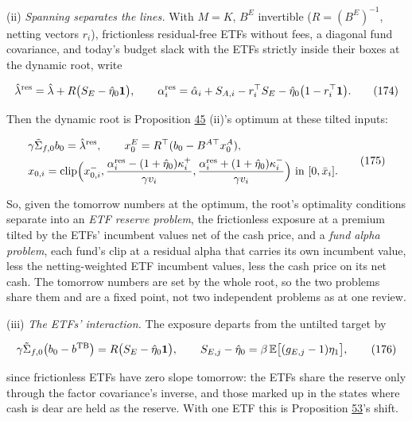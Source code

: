 \documentclass[11pt]{article}
\begin{document}
(ii) \emph{Spanning separates the lines.} With \(M=K\), \(B^E\) invertible
(\(R=(B^E)^{-1}\), netting vectors \(r_i\)), frictionless residual-free ETFs without
fees, a diagonal fund covariance, and today's budget slack with the
ETFs strictly inside their boxes at the dynamic root, write

\begin{equation*}
\hat\lambda^{\rm res}=\hat\lambda+R\bigl(S_E-\hat\eta_0\mathbf 1\bigr),\qquad
\alpha^{\rm res}_i=\hat\alpha_i+S_{A,i}-r_i^\top S_E-\hat\eta_0\bigl(1-r_i^\top\mathbf 1\bigr).\tag{174}\label{eq:174}
\end{equation*}

Then the dynamic root is Proposition \hyperref[res:Proposition-45]{45} (ii)'s optimum at these tilted
inputs:

\begin{equation*}
\begin{aligned}
&\gamma\tilde\Sigma_{f,0}b_0=\hat\lambda^{\rm res},\qquad x^E_0=R^\top(b_0-B^{A\top}x^A_0),\\
&x_{0,i}=\mathrm{clip}\Bigl(x^-_{0,i},\frac{\alpha^{\rm res}_i-(1+\hat\eta_0)\kappa^+_i}{\gamma v_i},\frac{\alpha^{\rm res}_i+(1+\hat\eta_0)\kappa^-_i}{\gamma v_i}\Bigr)\text{ in }[0,\bar x_i].
\end{aligned}\tag{175}\label{eq:175}
\end{equation*}

So, given the tomorrow numbers at the optimum, the root's optimality
conditions separate into an \emph{ETF reserve problem}, the frictionless
exposure at a premium tilted by the ETFs' incumbent values net of the
cash price, and a \emph{fund alpha problem}, each fund's clip at a residual
alpha that carries its own incumbent value, less the netting-weighted
ETF incumbent values, less the cash price on its net cash. The tomorrow
numbers are set by the whole root, so the two problems share them and
are a fixed point, not two independent problems as at one review.

(iii) \emph{The ETFs' interaction.} The exposure departs from the untilted
target by

\begin{equation*}
\gamma\tilde\Sigma_{f,0}\bigl(b_0-b^{\rm TB}\bigr)=R\bigl(S_E-\hat\eta_0\mathbf 1\bigr),\qquad
S_{E,j}-\hat\eta_0=\beta\,\mathbb E\bigl[(g_{E,j}-1)\eta_1\bigr],\tag{176}\label{eq:176}
\end{equation*}

since frictionless ETFs have zero slope tomorrow: the ETFs share the
reserve only through the factor covariance's inverse, and those marked
up in the states where cash is dear are held as the reserve. With one
ETF this is Proposition \hyperref[res:Proposition-53]{53}'s shift.
\end{document}
